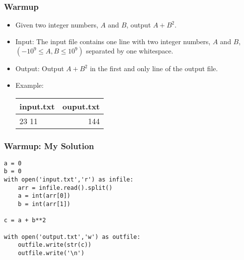 \begin{frame}[fragile]\frametitle{Warmup}
\begin{itemize}
\item Given two integer numbers, $A$  and $B$, output $A+B^2$.
\item Input: The input file contains one line with two integer numbers, $A$ and $B$, $(-10^9 \le A,B \le 10^9)$ separated by one whitespace.
\item Output: Output $A+B^2$  in the first and only line of the output file.
\item Example:

\begin{table}[h!]
    \begin{tabular}{|l|r|}
	\hline
      input.txt & ouput.txt\\
      \hline
      23 11 & 144\\
	  \hline
    \end{tabular}
\end{table}
\end{itemize}
\end{frame}

\begin{frame}[fragile]\frametitle{Warmup: My Solution}
\begin{lstlisting}
a = 0
b = 0
with open('input.txt','r') as infile:
	arr = infile.read().split()
	a = int(arr[0])
	b = int(arr[1])
	
c = a + b**2

with open('output.txt','w') as outfile:
	outfile.write(str(c))
	outfile.write('\n')
\end{lstlisting}
\end{frame}

